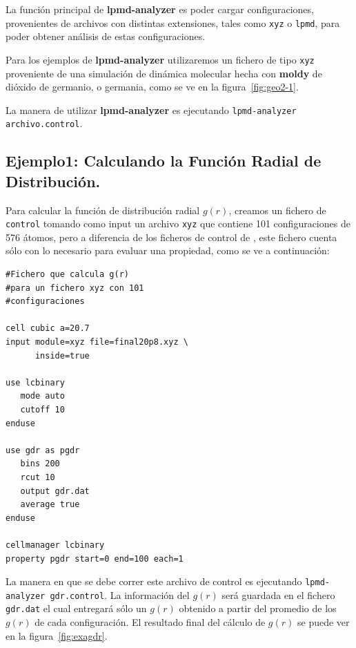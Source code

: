 La funci\'on principal de \textbf{lpmd-analyzer} es poder cargar configuraciones, provenientes de archivos con distintas extensiones, tales como \verb|xyz| o \verb|lpmd|, para poder obtener an\'alisis de estas configuraciones.

Para los ejemplos de \textbf{lpmd-analyzer} utilizaremos un fichero de tipo \verb|xyz| proveniente de una simulaci\'on de din\'amica molecular hecha con \textbf{moldy} de di\'oxido de germanio, o germania, como se ve en la figura~\ref{fig:geo2-1}.

La manera de utilizar \textbf{lpmd-analyzer} es ejecutando \verb|lpmd-analyzer archivo.control|.



\subsection{Ejemplo1: Calculando la Funci\'on Radial de Distribuci\'on.}

Para calcular la funci\'on de distribuci\'on radial $g(r)$, creamos un fichero de \verb|control| tomando como input un archivo \verb|xyz| que contiene 101 configuraciones de 576 \'atomos, pero a diferencia de los ficheros de control de {\lpmd}, este fichero cuenta s\'olo con lo necesario para evaluar una propiedad, como se ve a continuaci\'on:

\begin{multicols}{2}
\setlength{\columnseprule}{.5pt}
\begin{verbatim}
#Fichero que calcula g(r)
#para un fichero xyz con 101 
#configuraciones

cell cubic a=20.7
input module=xyz file=final20p8.xyz \
      inside=true

use lcbinary
   mode auto
   cutoff 10
enduse

use gdr as pgdr
   bins 200
   rcut 10
   output gdr.dat
   average true
enduse

cellmanager lcbinary
property pgdr start=0 end=100 each=1
\end{verbatim}
\end{multicols}

La manera en que se debe correr este archivo de control es ejecutando \verb|lpmd-analyzer gdr.control|. La informaci\'on del $g(r)$ ser\'a guardada en el fichero \verb|gdr.dat| el cual entregar\'a s\'olo un $g(r)$ obtenido a partir del promedio de los $g(r)$ de cada configuraci\'on. El resultado final del c\'alculo de $g(r)$ se puede ver en la figura~\ref{fig:exagdr}.


